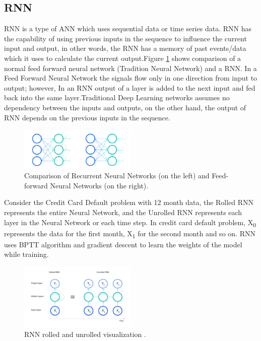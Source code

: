 \documentclass[twoside,11pt,a4paper]{article}
\begin{document}
\subsection{\acf{RNN}}
\acf{RNN} is a type of \acs{ANN} which uses sequential data or time series data. \acs{RNN} has the capability of using previous inputs in the sequence to influence the current input and output, in other words, the \acs{RNN} has a memory of past events/data which it uses to calculate the current output.Figure \ref{fig:rnn_nn} shows comparison of a normal feed forward neural network (Tradition Neural Network)  and a \acs{RNN}. In a Feed Forward Neural Network the signals flow only in one direction from input to output; however, In an \acs{RNN} output of a layer is added to the next input and fed back into the same layer.Traditional Deep Learning networks assumes no dependency between the inputs and outputs, on the other hand, the output of \acs{RNN} depends on the previous inputs in the sequence.\\
\begin{figure}[ht]
	\centering
	\includegraphics[width=0.5\textwidth]{rnn_nn}
	\caption[Comparison of Recurrent Neural Networks (on the left) and Feed-forward Neural Networks (on the right)]{Comparison of Recurrent Neural Networks (on the left) and Feed-forward Neural Networks (on the right)\citep{ibm2022rnn}.}
	\label{fig:rnn_nn}
\end{figure}
\FloatBarrier
Consider the Credit Card Default problem with 12 month data, the Rolled \acs{RNN} represents the entire Neural Network, and the Unrolled \acs{RNN} represents each layer in the Neural Network or each time step. In credit card default problem, X\textsubscript{0}  represents the data for the first month, X\textsubscript{1} for the second month and so on. \acs{RNN} uses \acf{BPTT} algorithm and gradient descent to learn the weights of the model while training.\\
\begin{figure}[ht]
	\centering
	\includegraphics[width=0.5\textwidth]{rnn_rolled_unrolled}
	\caption[\acs{RNN} rolled and unrolled visualization]{\acs{RNN} rolled and unrolled visualization \citep{ibm2022rnn}.}
	\label{fig:rnn_rolled_unrolled}
\end{figure}
\end{document}
